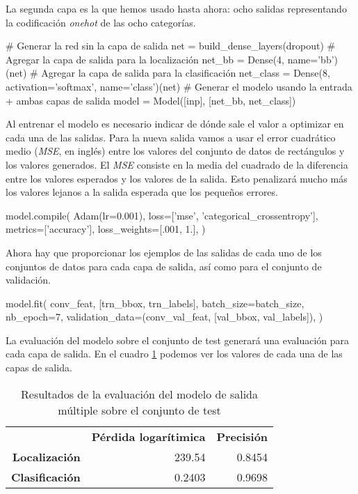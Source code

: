 La segunda capa es la que hemos usado hasta ahora: ocho salidas representando la
codificación \textit{onehot} de las ocho categorías.
\begin{python}
# Generar la red sin la capa de salida 
net = build_dense_layers(dropout)
# Agregar la capa de salida para la localización
net_bb = Dense(4, name='bb')(net)
# Agregar la capa de salida para la clasificación
net_class = Dense(8, activation='softmax', name='class')(net)
# Generar el modelo usando la entrada + ambas capas de salida
model = Model([inp], [net_bb, net_class])
\end{python}

Al entrenar el modelo es necesario indicar de dónde sale el valor a optimizar
en cada una de las salidas. Para la nueva salida vamos a usar el error
cuadrático medio (\textit{MSE}, en inglés) entre los valores del conjunto de
datos de rectángulos y los valores generados. El \textit{MSE} consiste en la
media del cuadrado de la diferencia entre los valores esperados y los valores
de la salida. Esto penalizará mucho más los valores lejanos a la salida
esperada que los pequeños errores.

\begin{python}
model.compile(
    Adam(lr=0.001),
    loss=['mse', 'categorical_crossentropy'],
    metrics=['accuracy'],
    loss_weights=[.001, 1.],
)
\end{python}

Ahora hay que proporcionar los ejemplos de las salidas de cada uno de los
conjuntos de datos para cada capa de salida, así como para el conjunto de
validación.

\begin{python}
model.fit(
    conv_feat,
    [trn_bbox, trn_labels],
    batch_size=batch_size,
    nb_epoch=7,
    validation_data=(conv_val_feat, [val_bbox, val_labels]),
)
\end{python}

La evaluación del modelo sobre el conjunto de test generará una evaluación para
cada capa de salida. En el cuadro \ref{eval_multi} podemos ver los valores de
cada una de las capas de salida.

\begin{table}[]
\centering
\caption{Resultados de la evaluación del modelo de salida múltiple sobre el
conjunto de test}
\label{eval_multi}
\begin{tabular}{rrr}
                       & \textbf{Pérdida logarítimica} & \textbf{Precisión} \\
\textbf{Localización}  & 239.54                        & 0.8454             \\
\textbf{Clasificación} & 0.2403                        & 0.9698            
\end{tabular}
\end{table}

